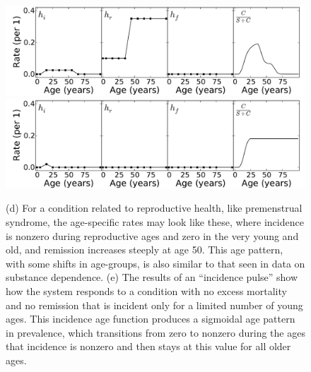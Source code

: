 \begin{figure}
\begin{center}
\includegraphics[width=\textwidth]{forward-sim-reproductive.pdf}
\includegraphics[width=\textwidth]{forward-sim-incidence_pulse.pdf}
\caption{(d) For a condition related to reproductive health, like
  premenstrual syndrome, the age-specific rates may look like these,
  where incidence is nonzero during reproductive ages and zero in
  the very young and old, and remission increases steeply at age
  50. This age pattern, with some shifts in age-groups, is also similar
  to that seen in data on substance dependence.
(e) The results of an ``incidence pulse'' show how the system
  responds to a condition with no excess mortality and no remission
  that is incident only for a limited number of young ages.  This
  incidence age function produces a sigmoidal age pattern in
  prevalence, which transitions from zero to nonzero during the ages
  that incidence is nonzero and then stays at this value for all
  older ages.}
\label{forward-sim-ex3b}
\end{center}
\end{figure}


